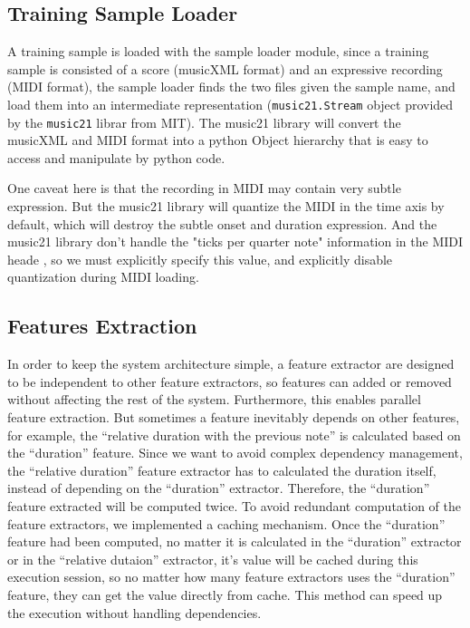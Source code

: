 
\subsection{Training Sample Loader}
   A training sample is loaded with the sample loader module, since a training sample is consisted of a score (musicXML format) and an expressive recording (MIDI format), the sample loader finds the two files given the sample name, and load them into an intermediate representation (\texttt{music21.Stream} object provided by the \texttt{music21} librar \cite{music21} from MIT). The music21 library will convert the musicXML and MIDI format into a python Object hierarchy that is easy to access and manipulate by python code. 

One caveat here is that the recording in MIDI may contain very subtle expression. But the music21 library will quantize the MIDI in the time axis by default, which will destroy the subtle onset and duration expression. And the music21 library don't handle the "ticks per quarter note" information in the MIDI heade \cite{midispec}, so we must explicitly specify this value, and explicitly disable quantization during MIDI loading.

\subsection{Features Extraction}
In order to keep the system architecture simple, a feature extractor are designed to be independent to other feature extractors, so features can added or removed without affecting the rest of the system. Furthermore, this enables parallel feature extraction. But sometimes a feature inevitably depends on other features, for example, the \enquote{relative duration with the previous note} is calculated based on the \enquote{duration} feature. Since we want to avoid complex dependency management, the \enquote{relative duration} feature extractor has to calculated the duration itself, instead of depending on the \enquote{duration} extractor. Therefore, the \enquote{duration} feature extracted will be computed twice. To avoid redundant computation of the feature extractors, we implemented a caching mechanism. Once the \enquote{duration} feature had been computed, no matter it is calculated in the \enquote{duration} extractor or in the \enquote{relative dutaion} extractor, it's value will be cached during this execution session, so no matter how many feature extractors uses the \enquote{duration} feature, they can get the value directly from cache. This method can speed up the execution without handling dependencies.

